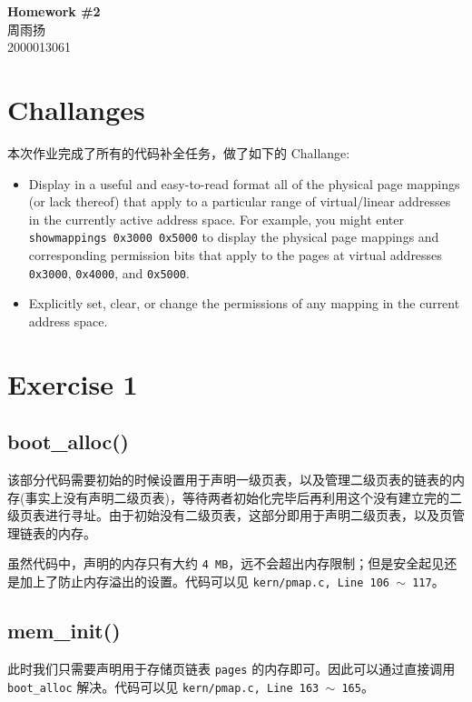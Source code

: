 \documentclass[11pt]{article}
\newcommand{\hwid}{2}			%
\newcommand{\name}{周雨扬} 		%
\newcommand{\id}{2000013061} 	%
\begin{document}
    \pagestyle{fancy}
    \chead{}

    \begin{center}
        {\LARGE \bf Homework \#\hwid}\\
        {\Large \name}\\
        {\Large \id}\\
    \end{center}

	\section{Challanges}
		\par 本次作业完成了所有的代码补全任务，做了如下的 Challange:
		\begin{itemize}
			\item Display in a useful and easy-to-read format all of the physical page mappings (or lack thereof) that apply to a particular range of virtual/linear addresses in the currently active address space. For example, you might enter \texttt{showmappings 0x3000 0x5000} to display the physical page mappings and corresponding permission bits that apply to the pages at virtual addresses \texttt{0x3000}, \texttt{0x4000}, and \texttt{0x5000}.
			\item Explicitly set, clear, or change the permissions of any mapping in the current address space.
		\end{itemize}
		
	\section{Exercise 1}
	
	\subsection*{boot\_alloc()}
		\par 该部分代码需要初始的时候设置用于声明一级页表，以及管理二级页表的链表的内存(事实上没有声明二级页表)，等待两者初始化完毕后再利用这个没有建立完的二级页表进行寻址。由于初始没有二级页表，这部分即用于声明二级页表，以及页管理链表的内存。
		
		\par 虽然代码中，声明的内存只有大约 \texttt{4 MB}，远不会超出内存限制；但是安全起见还是加上了防止内存溢出的设置。代码可以见 \texttt{kern/pmap.c, Line 106 $\sim$ 117}。
		
	\subsection*{mem\_init()}
		\par 此时我们只需要声明用于存储页链表 \texttt{pages} 的内存即可。因此可以通过直接调用 \texttt{boot\_alloc} 解决。代码可以见 \texttt{kern/pmap.c, Line 163 $\sim$ 165}。
		
\end{document}
